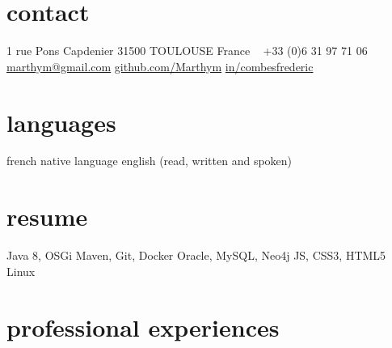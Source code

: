 \documentclass{friggeri-cv} 	%
\begin{document}


\begin{aside} %
\section{contact}
1 rue Pons Capdenier
31500 TOULOUSE
France
~
+33 (0)6 31 97 71 06
\href{mailto:marthym@gmail.com}{marthym@gmail.com}
\href{https://github.com/Marthym}{github.com/Marthym}
\href{https://www.linkedin.com/in/combesfrederic}{in/combesfrederic}
\section{languages}
french native language
english (read, written and spoken)
\section{resume}
Java 8, OSGi
Maven, Git, Docker
Oracle, MySQL, Neo4j
JS, CSS3, HTML5
Linux
\end{aside}

\section{professional experiences}
\end{document}
